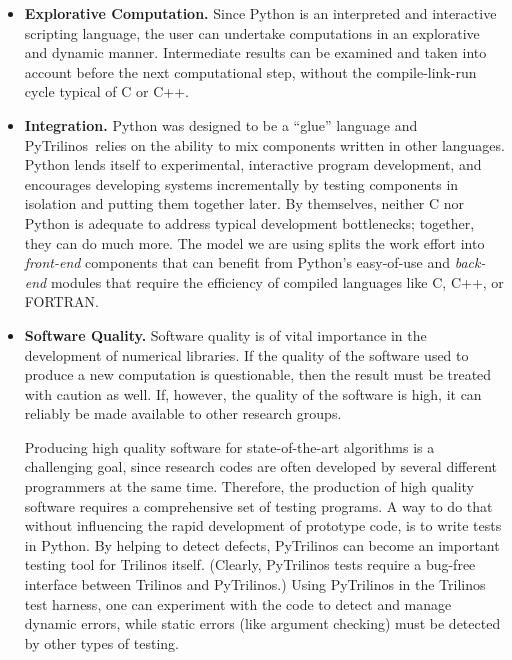 \documentclass[acmtocl]{acmtrans2m}
\newcommand{\PyTrilinos}{{PyTrilinos}}
\begin{document}
\begin{itemize}
\item {\bf Explorative Computation.} Since Python is an interpreted
  and interactive scripting language, the user can undertake
  computations in an explorative and dynamic manner. Intermediate
  results can be examined and taken into account before the next
  computational step, without the compile-link-run cycle typical of C
  or C++.

\item {\bf Integration.} Python was designed to be a ``glue'' language
  and \PyTrilinos\ relies on the ability to mix components written in
  other languages. 
  Python lends itself to
  experimental, interactive program development, and encourages
  developing systems incrementally by testing components in isolation
  and putting them together later.  By themselves, neither C nor
  Python is adequate to address typical development bottlenecks;
  together, they can do much more.  The model we are using splits the
  work effort into {\sl front-end} components that can benefit from
  Python's easy-of-use and {\sl back-end} modules that require the
  efficiency of compiled languages like C, C++, or FORTRAN.

\item {\bf Software Quality.} Software quality is of vital importance
  in the development of numerical libraries. If the quality of the
  software used to produce a new computation is questionable, then the
  result must be treated with caution as well. If, however, the
  quality of the software is high, it can reliably be made available
  to other research groups.

  Producing high quality software for state-of-the-art algorithms is a
  challenging goal, since research codes are often developed by
  several different programmers at the same time. Therefore, the
  production of high quality software requires a comprehensive set of
  testing programs. A way to do that without influencing the rapid
  development of prototype code, is to write tests in Python. By
  helping to detect defects, PyTrilinos can become an important
  testing tool for Trilinos itself. (Clearly, PyTrilinos tests require
  a bug-free interface between Trilinos and PyTrilinos.) Using
  PyTrilinos in the Trilinos test harness, one can experiment with the
  code to detect and manage dynamic errors, while static errors (like
  argument checking) must be detected by other types of testing.


\end{itemize}
\end{document}
